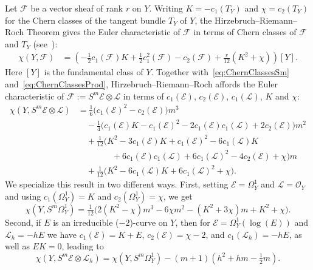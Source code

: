 \documentclass[12pt, reqno]{amsart}
\theoremstyle{definition}
\newcommand{\calE}{{\mathcal E}}
\newcommand{\calFA}{{\mathcal F}}
\newcommand{\calL}{{\mathcal L}}
\newcommand{\calO}{{\mathcal O}}
\numberwithin{equation}{section}
\numberwithin{table}{section}
\begin{document}
Let $\calFA$ be a vector sheaf of rank $r$ on $Y$. Writing $K = -c_1(T_Y)$ and $\chi = c_2(T_Y)$ for the Chern classes of the tangent bundle $T_Y$ of $Y$, the Hirzebruch--Riemann--Roch Theorem  gives the Euler characteristic of $\calFA$ in terms of Chern classes of $\calFA$ and $T_Y$ (see~\cite[Example~15.2.2]{Fulton}):
\begin{equation}
\label{eq:RR}
\begin{split}
	\chi(Y,\calFA) &= \left(-\frac{1}{2}c_1(\calFA) K + \frac{1}{2}c_1^2(\calFA) - c_2(\calFA) + \frac{r}{12}(K^2 + \chi) \right)[Y].
\end{split}
\end{equation}
Here $[Y]$ is the fundamental class of $Y$. Together with~\eqref{eq:ChernClassesSm} and~\eqref{eq:ChernClassesProd}, Hirzebruch--Riemann--Roch affords the Euler characteristic of $\calFA := S^m\calE\otimes \calL$ in terms of $c_1(\calE)$, $c_2(\calE)$, $c_1(\calL)$, $K$ and $\chi$:
\begin{equation}
\label{eq:RRSmEL}
\begin{split}
\chi(Y,S^m \calE\otimes \calL)&=\tfrac{1}{6}\big(
c_1(\calE)^2-c_2(\calE)
\big)m^3\\
&\hspace{1em}-\tfrac{1}{4}\big(
c_1(\calE)K-c_1(\calE)^2-2c_1(\calE)c_1(\calL)+2c_2(\calE)
\big)m^2\\
&\hspace{1em}+\tfrac{1}{12}\big(
K^2-3c_1(\calE)K+c_1(\calE)^2-6c_1(\calL)K\\
&\hspace{4em}+6c_1(\calE)c_1(\calL)+6c_1(\calL)^2-4c_2(\calE)+\chi
\big)m\\
&\hspace{1em}+\tfrac{1}{12}\big(K^2-6c_1(\calL)K+6c_1(\calL)^2+\chi
\big).
\end{split}
\end{equation}
We specialize this result in two different ways.  First, setting $\calE = \Omega^1_Y$ and $\calL = \calO_Y$ and using $c_1(\Omega^1_Y)=K$ and $c_2(\Omega^1_Y)=\chi$, we get
\begin{equation}\label{E:chiYSm}
\chi(Y,S^m\Omega^1_Y)=\tfrac{1}{12}\big(
2(K^2-\chi)m^3-6\chi m^2-(K^2+3\chi)m+K^2+\chi
\big).
\end{equation}
Second, if $E$ is an irreducible ($-2$)-curve on $Y$, then
for $\calE=\Omega^1_Y(\log(E))$ and $\calL_h=-hE$ we have $c_1(\calE)=K+E$, $c_2(\calE)=\chi-2$, and $c_1(\calL_h)=-hE$, as well as $EK=0$, leading to
\begin{equation}\label{E:chirel}
\chi(Y,S^m\calE\otimes\calL_h)=\chi(Y,S^m\Omega^1_Y)-(m+1)(h^2+hm-\tfrac{1}{2}m).
\end{equation}
\end{document}
